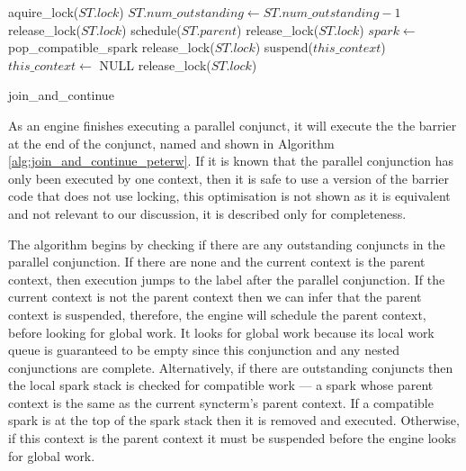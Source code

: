 \begin{algorithm}
\begin{algorithmic}
  \State aquire\_lock($ST.lock$)
  \State $ST.num\_outstanding \gets ST.num\_outstanding - 1$
      \State release\_lock($ST.lock$)
    \Else
      \State schedule($ST.parent$)
      \State release\_lock($ST.lock$)
    \EndIf
  \Else
    \State $spark \gets$ pop\_compatible\_spark
       \State release\_lock($ST.lock$)
    \Else
         \State suspend($this\_context$)
         \State $this\_context \gets$ NULL
      \EndIf
      \State release\_lock($ST.lock$)
    \EndIf
  \EndIf
\EndProcedure
\end{algorithmic}
\caption{join\_and\_continue}
\label{alg:join_and_continue_peterw}
\end{algorithm}

As an engine finishes executing a parallel conjunct,
it will execute the the barrier at the end of the conjunct,
named \joinandcontinue and shown in 
Algorithm \ref{alg:join_and_continue_peterw}.
If it is known that the parallel conjunction has only been executed by
one context,
then it is safe to use a version of the barrier code that does not use
locking,
this optimisation is not shown as it is equivalent and not relevant to
our discussion,
it is described only for completeness.

The algorithm begins by checking if there are any outstanding conjuncts in
the parallel conjunction.
If there are none and the current context is the parent
context,
then execution jumps to the label after the parallel conjunction.
If the current context is not the parent context then
we can infer that the parent context is suspended,
therefore, 
the engine will schedule the parent context, before looking for global work.
It looks for global work because its local work queue is guaranteed to be
empty since this conjunction and any nested conjunctions are complete.
Alternatively, if there are outstanding conjuncts then
the local spark stack is checked for compatible work ---
a spark whose parent context is the same as the current syncterm's parent
context.
If a compatible spark is at the top of the spark stack then it is removed
and executed.
Otherwise,
if this context is the parent context it must be suspended
before the engine looks for global work.

